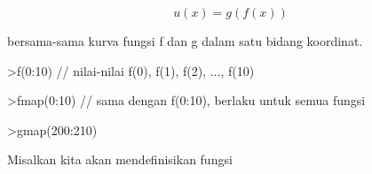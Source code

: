 \documentclass[a4paper,10pt]{article}
\begin{document}
\begin{eulernotebook}
\begin{eulercomment}
\end{eulercomment}
\begin{eulerformula}
\[
u(x)=g(f(x))
\]
\end{eulerformula}
\begin{eulercomment}
bersama-sama kurva fungsi f dan g dalam satu bidang koordinat.
\end{eulercomment}
\begin{eulerprompt}
>f(0:10) // nilai-nilai f(0), f(1), f(2), ..., f(10)
\end{eulerprompt}
\begin{euleroutput}
  [1,  4.31978,  10.4826,  19.1516,  32.4692,  50.3833,  72.7562,
  99.929,  130.69,  163.51,  200.58]
\end{euleroutput}
\begin{eulerprompt}
>fmap(0:10) // sama dengan f(0:10), berlaku untuk semua fungsi
\end{eulerprompt}
\begin{euleroutput}
  [1,  4.31978,  10.4826,  19.1516,  32.4692,  50.3833,  72.7562,
  99.929,  130.69,  163.51,  200.58]
\end{euleroutput}
\begin{eulerprompt}
>gmap(200:210)
\end{eulerprompt}
\begin{euleroutput}
  [0.987534,  0.987596,  0.987657,  0.987718,  0.987778,  0.987837,
  0.987896,  0.987954,  0.988012,  0.988069,  0.988126]
\end{euleroutput}
\begin{eulercomment}
Misalkan kita akan mendefinisikan fungsi


\end{eulercomment}
\end{eulernotebook}
\end{document}
